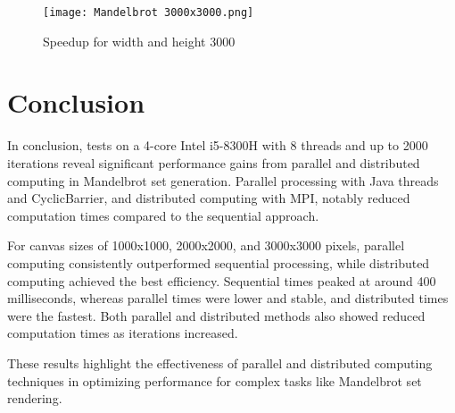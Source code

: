 \documentclass[sigconf]{acmart}
\begin{document}
\begin{figure}[H]
    \centering
    \texttt{[image: Mandelbrot 3000x3000.png]} %
    \caption{Speedup for width and height 3000}
    \label{fig:3000}
\end{figure}

\section{Conclusion}
In conclusion, tests on a 4-core Intel i5-8300H with 8 threads and up to 2000 iterations reveal significant performance gains from parallel and distributed computing in Mandelbrot set generation. Parallel processing with Java threads and CyclicBarrier, and distributed computing with MPI, notably reduced computation times compared to the sequential approach.

For canvas sizes of 1000x1000, 2000x2000, and 3000x3000 pixels, parallel computing consistently outperformed sequential processing, while distributed computing achieved the best efficiency. Sequential times peaked at around 400 milliseconds, whereas parallel times were lower and stable, and distributed times were the fastest. Both parallel and distributed methods also showed reduced computation times as iterations increased.

These results highlight the effectiveness of parallel and distributed computing techniques in optimizing performance for complex tasks like Mandelbrot set rendering.
\end{document}

